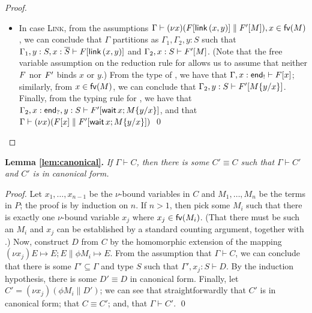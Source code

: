 \documentclass[oribibl,orivec,envcountsame]{llncs}
\begin{document}
\begin{proof}
\begin{itemize}
  \item In case \textsc{Link}, from the assumptions $\Gamma \vdash (\nu x) (\Fx[\gvconst{link} \app
    (x, y)] \parallel \Fx'[M]), x \in \fv(M)$, we can conclude that $\Gamma$ partitions as
    $\Gamma_1,\Gamma_2,y:S$ such that $\Gamma_1,y:S,x:\gvdual{S} \vdash \Fx[\gvconst{link} \app (x,
    y)]$ and $\Gamma_2,x:S \vdash \Fx'[M]$.  (Note that the free variable assumption on the
    reduction rule for  allows us to assume that neither $\Fx$ nor $\Fx'$ binds $x$ or
    $y$.)  From the type of , we have that $\Gamma,x:\outterm \vdash \Fx[x]$;
    similarly, from $x \in \fv(M)$, we can conclude that $\Gamma_2,y:S \vdash \Fx'[M\{\bind x y\}]$.
    Finally, from the typing rule for , we have that $\Gamma_2,x:\interm,y:S \vdash
    \Fx'[\gvletunit{\gvconst{wait} \app x}{M\{\bind x y\}}]$, and that $\Gamma \vdash (\nu
    x)(\Fx[x] \parallel \Fx'[\gvletunit{\gvconst{wait} \app x}{M\{\bind x y\}}])$
  \qed
  \end{itemize}
\end{proof}


\noindent
\textbf{Lemma \ref{lem:canonical}.}
\textit{If $\Gamma \vdash C$, then there is some $C' \equiv C$ such that $\Gamma \vdash C'$ and $C'$ is in
  canonical form.}

\begin{proof}
  Let $x_1,\dots,x_{n-1}$ be the $\nu$-bound variables in $C$ and $M_1,\dots,M_n$ be the terms in
  $P$; the proof is by induction on $n$.  If $n > 1$, then pick some $M_i$ such that there is
  exactly one $\nu$-bound variable $x_j$ where $x_j \in \fv(M_i)$.  (That there must be such an
  $M_i$ and $x_j$ can be established by a standard counting argument, together with
  .)  Now, construct $D$ from $C$ by the homomorphic extension of
  the mapping $(\nu x_j)E \mapsto E; E \parallel \phi M_i \mapsto E$.  From the assumption
  that $\Gamma \vdash C$, we can conclude that there is some $\Gamma' \subseteq \Gamma$ and type $S$
  such that $\Gamma',x_j:S \vdash D$.  By the induction hypothesis, there is some $D' \equiv D$ in
  canonical form.  Finally, let $C' = (\nu x_j)(\phi M_i \parallel D')$; we can see that
  straightforwardly that $C'$ is in canonical form; that $C \equiv C'$; and, that $\Gamma \vdash
  C'$. \qed
\end{proof}
\end{document}
